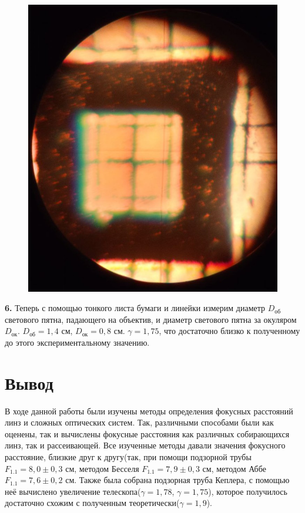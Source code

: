 \documentclass[a4paper,12pt]{article}
\begin{document}
\begin{figure}[H]
	\centering
	\includegraphics[scale=0.3]{photo2.jpg}
\end{figure}


\textbf{6.} Теперь с помощью тонкого листа бумаги и линейки измерим диаметр $D_\text{об}$ светового пятна, падающего на объектив, и диаметр светового пятна за окуляром $D_\text{ок}$. $D_\text{об} = 1,4$ см, $D_\text{ок} = 0,8$ см. $\gamma = 1,75$, что достаточно близко к полученному до этого экспериментальному значению.

\section{Вывод}
В ходе данной работы были изучены методы определения фокусных расстояний линз и сложных оптических систем. Так, различными способами были как оценены, так и вычислены фокусные расстояния как различных собирающихся линз, так и рассеивающей. Все изученные методы давали значения фокусного расстояние, близкие друг к другу(так, при помощи подзорной трубы $F_{1.1} = 8,0 \pm 0,3$ см, методом Бесселя $F_{1.1} = 7,9 \pm 0,3$ см, методом Аббе $F_{1.1} = 7,6 \pm 0,2$ см. Также была собрана подзорная труба Кеплера, с помощью неё вычислено увеличение телескопа($\gamma = 1,78$, $\gamma = 1,75$), которое получилось достаточно схожим с полученным теоретически($\gamma = 1,9$).
\end{document}

